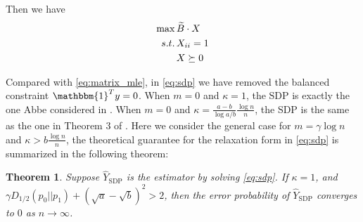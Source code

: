 \documentclass[conference]{IEEEtran}
\newtheorem{theorem}{Theorem}
\DeclareMathOperator{\SDP}{SDP}
\begin{document}
	Then we have
	\begin{align}
	\max\, & \widetilde{B} \cdot X \notag \\
	s.t.\,& X_{ii}=1 \notag \\
	& X \succeq 0 \label{eq:sdp}
	\end{align}
	
	Compared with \eqref{eq:matrix_mle}, in \eqref{eq:sdp} we have removed
	the balanced constraint $\mathbbm{1}^T y = 0$. When $m=0$ and $\kappa=1$,
	the SDP is exactly the one Abbe considered in \cite{abbe2015exact}.
	When $m=0$ and $\kappa=\frac{a-b}{\log a/b}\frac{\log n}{n}$, the SDP is
	the same as the one in Theorem 3 of \cite{Hajek16}. Here we consider the
	general case for $m=\gamma \log n$ and $\kappa > b\frac{\log n}{n}$,
	the theoretical guarantee for the relaxation form in \eqref{eq:sdp} is summarized
	in the following theorem:
	\begin{theorem}\label{thm:sdp}
		Suppose $\hat{Y}_{\SDP}$ is the estimator by solving \eqref{eq:sdp}.
		If $\kappa = 1$,
		and $\gamma D_{1/2}(p_0||p_1) + (\sqrt{a} - \sqrt{b})^2 > 2$,
		then the error probability of $\hat{Y}_{\SDP}$ converges to $0$ as $n\to \infty$.
	\end{theorem}
\end{document}
